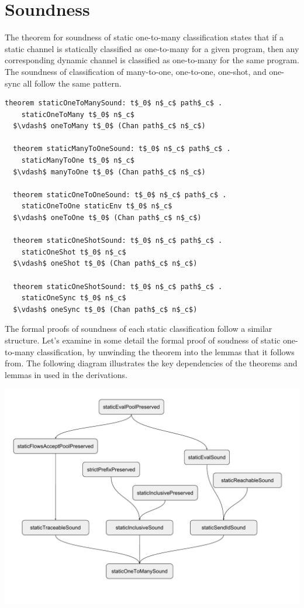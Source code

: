 \documentclass[letterpaper, 11pt]{report}
\begin{document}
\section{Soundness}

The theorem for soundness of static one-to-many classification states that if a static channel is
statically classified as one-to-many for a given program,
then any corresponding dynamic channel is classified
as one-to-many for the same program.
The soundness of classification of many-to-one, one-to-one, one-shot, and one-sync
all follow the same pattern.

\begin{lstlisting}[language=logic, mathescape]
  theorem staticOneToManySound: t$_0$ n$_c$ path$_c$ . 
    staticOneToMany t$_0$ n$_c$
  $\vdash$ oneToMany t$_0$ (Chan path$_c$ n$_c$)

  theorem staticManyToOneSound: t$_0$ n$_c$ path$_c$ . 
    staticManyToOne t$_0$ n$_c$
  $\vdash$ manyToOne t$_0$ (Chan path$_c$ n$_c$)

  theorem staticOneToOneSound: t$_0$ n$_c$ path$_c$ . 
    staticOneToOne staticEnv t$_0$ n$_c$
  $\vdash$ oneToOne t$_0$ (Chan path$_c$ n$_c$)

  theorem staticOneShotSound: t$_0$ n$_c$ path$_c$ .
    staticOneShot t$_0$ n$_c$
  $\vdash$ oneShot t$_0$ (Chan path$_c$ n$_c$)

  theorem staticOneShotSound: t$_0$ n$_c$ path$_c$ .
    staticOneSync t$_0$ n$_c$
  $\vdash$ oneSync t$_0$ (Chan path$_c$ n$_c$)
\end{lstlisting}

The formal proofs of soundness of each static classification follow a similar structure.
Let's examine in some detail the formal proof of soudness of static one-to-many classification,
by unwinding the theorem into the lemmas that it follows from. The following diagram illustrates
the key dependencies of the theorems and lemmas in used in the derivations.

\includegraphics[width=1\textwidth]{cml-proof-low.pdf}
\end{document}

